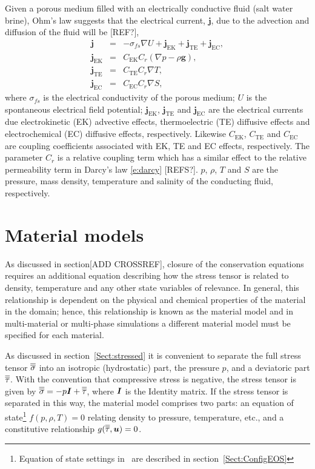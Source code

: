 Given a porous medium filled with an electrically conductive fluid (\eg salt water brine), Ohm's law suggests that the electrical current, $\mathbf{j}$, due to the advection and diffusion of the fluid will be [REF?],
\begin{eqnarray}
 \mathbf{j} & = & - \sigma_{fs} \nabla U + \mathbf{j}_\mathrm{EK} + \mathbf{j}_\mathrm{TE} + \mathbf{j}_\mathrm{EC}, \\
 \mathbf{j}_\mathrm{EK} & = & C_\mathrm{EK} C_r \left( \nabla p - \rho \mathbf{g} \right),\\
 \mathbf{j}_\mathrm{TE} & = & C_\mathrm{TE} C_r \nabla T,\\
 \mathbf{j}_\mathrm{EC} & = & C_\mathrm{EC} C_r \nabla S,
\end{eqnarray}
where $\sigma_{fs}$ is the electrical conductivity of the porous medium; $U$
is the spontaneous electrical field potential; $\mathbf{j}_{\mathrm{EK}}$,
$\mathbf{j}_{\mathrm{TE}}$ and $\mathbf{j}_{\mathrm{EC}}$ are the electrical
currents due electrokinetic (EK) advective effects, thermoelectric (TE)
diffusive effects and electrochemical (EC) diffusive effects, respectively.
Likewise $C_{\mathrm{EK}}$, $C_{\mathrm{TE}}$ and $C_{\mathrm{EC}}$ are coupling
coefficients associated with EK, TE and EC effects, respectively.  The
parameter $C_r$ is a relative coupling term which has a similar effect to
the relative permeability term in Darcy's law \eqref{e:darcy} [REFS?]. $p$,
$\rho$, $T$ and $S$ are the pressure, mass density, temperature and salinity
of the conducting fluid, respectively.

\section{Material models}

As discussed in section[ADD CROSSREF], closure of the conservation equations requires an additional equation describing how the stress tensor is related to density, temperature and any other state variables of relevance.  In general, this relationship is dependent on the physical and chemical properties of the material in the domain; hence, this relationship is known as the material model and in multi-material or multi-phase simulations a different material model must be specified for each material.

As discussed in section~\ref{Sect:stressed} it is convenient to separate the full stress tensor $\overline{\overline{\sigma}}$ into an isotropic (hydrostatic) part, the pressure $p$, and a deviatoric part $\overline{\overline{\tau}}$.  With the convention that compressive stress is negative, the stress tensor is given by $\overline{\overline{\sigma}} =-p {\mbox{\boldmath$I$}} + \overline{\overline{\tau}}$, where ${\mbox{\boldmath$I$}}$ is the Identity matrix. If the stress tensor is separated in this way, the material model comprises two parts: an equation of state\footnote{Equation of state settings in \fluidity\ are described in section~\ref{Sect:ConfigEOS}} $f(p,\rho,T)=0$ relating density to pressure, temperature, etc., and a constitutive relationship $g(\overline{\overline{\tau}},{\mbox{\boldmath$u$}})=0$.

